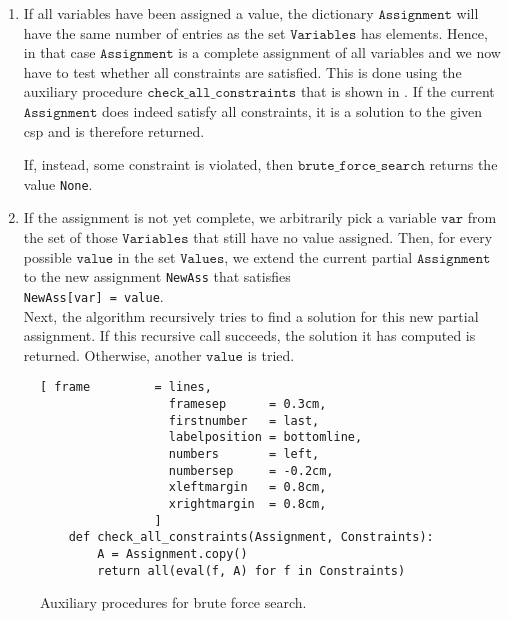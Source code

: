 \begin{enumerate}
\item If all variables have been assigned a value, the dictionary $\texttt{Assignment}$ will have the same
      number of entries as the set $\texttt{Variables}$ has elements.  Hence, in that case
      $\texttt{Assignment}$ is a complete assignment of all variables and we now have to test whether
      all constraints are satisfied.  This is done using the auxiliary procedure
      $\texttt{check\_all\_constraints}$ that is shown in . 
      If the current $\texttt{Assignment}$ does indeed satisfy all constraints, it is a solution to the given
      \ac{csp} and is therefore returned.

      If, instead, some constraint is violated, then $\texttt{brute\_force\_search}$ returns the value
      \texttt{None}.
\item If the assignment is not yet complete, we arbitrarily 
      pick a variable $\texttt{var}$ from the set of those $\texttt{Variables}$ that still have no value assigned.  
      Then, for every possible  $\texttt{value}$ in the set $\texttt{Values}$, we extend the current partial
      $\texttt{Assignment}$ to the new assignment \texttt{NewAss} that satisfies
      \\[0.2cm]
      \hspace*{1.3cm}
      \texttt{NewAss[var] = value}.
      \\[0.2cm]
      Next, the algorithm recursively tries to find a solution for this new partial assignment.
      If this recursive call succeeds, the solution it has computed is returned.  Otherwise, another
      $\texttt{value}$ is tried.
\end{enumerate}


\begin{figure}[!ht]
\centering
\begin{Verbatim}[ frame         = lines, 
                  framesep      = 0.3cm, 
                  firstnumber   = last,
                  labelposition = bottomline,
                  numbers       = left,
                  numbersep     = -0.2cm,
                  xleftmargin   = 0.8cm,
                  xrightmargin  = 0.8cm,
                ]
    def check_all_constraints(Assignment, Constraints):
        A = Assignment.copy()
        return all(eval(f, A) for f in Constraints)
\end{Verbatim}
\vspace*{-0.3cm}
\caption{Auxiliary procedures for brute force search.}
\label{fig:Brute-Force-Solver.ipynb-2}
\end{figure}

